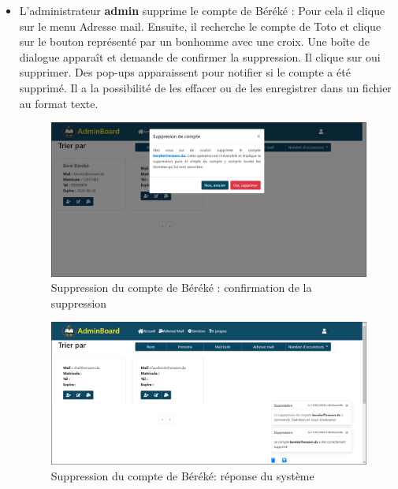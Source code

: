 \documentclass[a4paper,12pt,french]{report} %
\begin{document}
\begin{itemize}
\item L'administrateur \textbf{admin}  supprime le compte de Béréké : Pour cela il clique sur le menu Adresse mail. Ensuite, il recherche le compte de Toto et clique sur le bouton représenté par un bonhomme avec une croix. Une boîte de dialogue apparaît et demande de confirmer la suppression. Il clique sur oui supprimer. Des pop-ups apparaissent pour notifier si le compte a été supprimé. Il a la possibilité de les effacer ou de les enregistrer dans un fichier au format texte. %
\begin{figure}[H]
\centering
\includegraphics[width=483pt]{figure/admin_delete_bereke_acount1.png}
\caption{Suppression du compte de Béréké : confirmation de la suppression}
\end{figure} 
\begin{figure}[H]
	\centering
	\includegraphics[width=483pt]{figure/admin_delete_bereke_acount2.png}
	\caption{Suppression du compte de Béréké: réponse du système}
\end{figure}  


\end{itemize}
\end{document}
